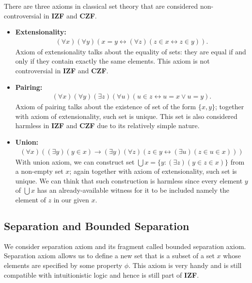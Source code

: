 \documentclass[12pt, a4paper]{article}
\theoremstyle{definition}
\theoremstyle{plain}
\begin{document}
There are three axioms in classical set theory that are considered non-controversial in {\bf IZF} and {\bf CZF}.
\begin{itemize}
\item {\bf Extensionality:} 
\begin{align*}
(\forall x)(\forall y)(x=y \leftrightarrow (\forall z)(z \in x \leftrightarrow z \in y)).
\end{align*}
Axiom of extensionality talks about the equality of sets: they are equal if and only if they contain exactly the same elements.
This axiom is not controversial in {\bf IZF} and {\bf CZF}.

\item {\bf Pairing:} 
\begin{align*}
(\forall x)(\forall y)(\exists z)(\forall u)(u \in z \leftrightarrow u=x \vee u=y).
\end{align*}
Axiom of pairing talks about the existence of set of the form $\{x,y\}$; together with axiom of extensionality, such set is unique.
This set is also considered harmless in {\bf IZF} and {\bf CZF} due to its relatively simple nature.

\item {\bf Union:} 
\begin{align*}
(\forall x)((\exists y)(y \in x)\rightarrow (\exists y)(\forall z)(z \in y \leftrightarrow (\exists u)(z \in u \in x))) 
\end{align*}
With union axiom, we can construct set $\bigcup x = \{y:(\exists z)(y \in z \in x)\}$ from a non-empty set $x$; again together with axiom of extensionality, such set is unique.
We can think that such construction is harmless since every element $y$ of $\bigcup x$ has an already-available witness for it to be included namely the element of $z$ in our given $x$.
\end{itemize}

\subsection{Separation and Bounded Separation}

We consider separation axiom and its fragment called bounded separation axiom.
Separation axiom allows us to define a new set that is a subset of a set $x$ whose elements are specified by some property $\phi$.
This axiom is very handy and is still compatible with intuitionistic logic and hence is still part of {\bf IZF}.
\end{document}
